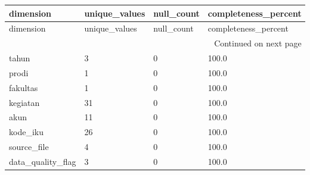 \begingroup
\scriptsize
\begin{longtable}{llll}
\toprule
dimension & unique_values & null_count & completeness_percent \\
\midrule
\endfirsthead
\toprule
dimension & unique_values & null_count & completeness_percent \\
\midrule
\endhead
\midrule
\multicolumn{4}{r}{Continued on next page} \\
\midrule
\endfoot
\bottomrule
\endlastfoot
tahun & 3 & 0 & 100.0 \\
prodi & 1 & 0 & 100.0 \\
fakultas & 1 & 0 & 100.0 \\
kegiatan & 31 & 0 & 100.0 \\
akun & 11 & 0 & 100.0 \\
kode\_iku & 26 & 0 & 100.0 \\
source\_file & 4 & 0 & 100.0 \\
data\_quality\_flag & 3 & 0 & 100.0 \\
\end{longtable}
\endgroup
